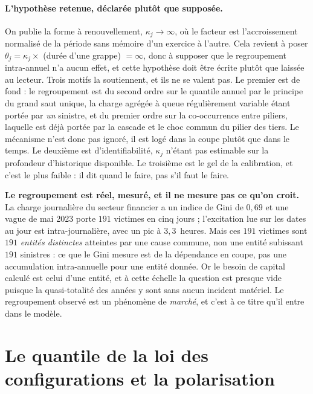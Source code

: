 \paragraph{L'hypothèse retenue, déclarée plutôt que supposée.} On publie la forme à
renouvellement, $\kappa_j\to\infty$, où le facteur est l'accroissement normalisé de la période
sans mémoire d'un exercice à l'autre. Cela revient à poser $\theta_j=\kappa_j\times$ (durée
d'une grappe) $=\infty$, donc à supposer que le regroupement intra-annuel n'a aucun effet, et
cette hypothèse doit être écrite plutôt que laissée au lecteur. Trois motifs la soutiennent, et
ils ne se valent pas. Le premier est de fond : le regroupement est du second ordre sur le
quantile annuel par le principe du grand saut unique, la charge agrégée à queue régulièrement
variable étant portée par \emph{un} sinistre, et du premier ordre sur la co-occurrence entre
piliers, laquelle est déjà portée par la cascade et le choc commun du pilier des tiers. Le
mécanisme n'est donc pas ignoré, il est logé dans la coupe plutôt que dans le temps. Le
deuxième est d'identifiabilité, $\kappa_j$ n'étant pas estimable sur la profondeur d'historique
disponible. Le troisième est le gel de la calibration, et c'est le plus faible : il dit quand le
faire, pas s'il faut le faire.

\begin{attention}
\textbf{Le regroupement est réel, mesuré, et il ne mesure pas ce qu'on croit.} La charge
journalière du secteur financier a un indice de Gini de $0{,}69$ et une vague de mai 2023 porte
$191$ victimes en cinq jours ; l'excitation lue sur les dates au jour est
intra-journalière, avec un pic à $3{,}3$~heures. Mais ces $191$ victimes
sont $191$ \emph{entités distinctes} atteintes par une cause commune, non une entité subissant
$191$ sinistres : ce que le Gini mesure est de la dépendance en coupe, pas une
accumulation intra-annuelle pour une entité donnée. Or le besoin de capital calculé est celui
d'une entité, et à cette échelle la question est presque vide puisque la quasi-totalité des
années y sont sans aucun incident matériel. Le regroupement observé est un phénomène de
\emph{marché}, et c'est à ce titre qu'il entre dans le modèle.
\end{attention}

\section{Le quantile de la loi des configurations et la polarisation}
\label{sec:ann-quantile-configurations}

